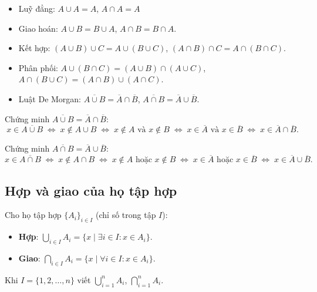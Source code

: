 \documentclass[12pt,a4paper]{article}
\begin{document}
\begin{tinhchat}[title={Tính chất các phép toán}]
  \begin{itemize}
    \item Luỹ đẳng: $A \cup A = A$, $A \cap A = A$
    \item Giao hoán: $A \cup B = B \cup A$, $A \cap B = B \cap A$.
    \item Kết hợp: $(A \cup B) \cup C = A \cup (B \cup C)$, $(A \cap B) \cap C = A \cap (B \cap C)$.
    \item Phân phối: $A \cup (B \cap C) = (A \cup B) \cap (A \cup C)$, $A \cap (B \cup C) = (A \cap B) \cup (A \cap C)$.
    \item Luật De Morgan: $\overline{A \cup B} = \overline{A} \cap \overline{B}$, $\overline{A \cap B} = \overline{A} \cup \overline{B}$.
  \end{itemize}
\end{tinhchat}

\begin{phuongphap}[title={Chứng minh De Morgan}]
  Chứng minh $\overline{A \cup B} = \overline{A} \cap \overline{B}$:
  \[
    x \in \overline{A \cup B} \;\Leftrightarrow\; x \notin A \cup B \;\Leftrightarrow\; x \notin A \text{ và } x \notin B \;\Leftrightarrow\; x \in \overline{A} \text{ và } x \in \overline{B} \;\Leftrightarrow\; x \in \overline{A} \cap \overline{B}.
  \]

  Chứng minh $\overline{A \cap B} = \overline{A} \cup \overline{B}$:
  \[
    x \in \overline{A \cap B} \;\Leftrightarrow\; x \notin A \cap B \;\Leftrightarrow\; x \notin A \text{ hoặc } x \notin B \;\Leftrightarrow\; x \in \overline{A} \text{ hoặc } x \in \overline{B} \;\Leftrightarrow\; x \in \overline{A} \cup \overline{B}.
  \]
\end{phuongphap}

\subsection{Hợp và giao của họ tập hợp}

\begin{dinhnghia}
  Cho họ tập hợp $\{A_i\}_{i \in I}$ (chỉ số trong tập $I$):
  \begin{itemize}
    \item \textbf{Hợp}: $\displaystyle\bigcup_{i \in I} A_i = \{x \mid \exists i \in I: x \in A_i\}$.
    \item \textbf{Giao}: $\displaystyle\bigcap_{i \in I} A_i = \{x \mid \forall i \in I: x \in A_i\}$.
  \end{itemize}
  Khi $I = \{1, 2, \ldots, n\}$ viết $\bigcup_{i=1}^{n} A_i$, $\bigcap_{i=1}^{n} A_i$.
\end{dinhnghia}
\end{document}
